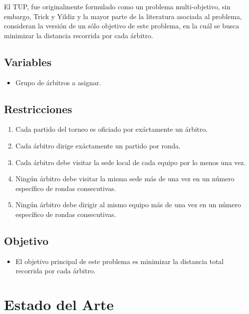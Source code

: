 \documentclass[letter, 10pt]{article}
\begin{document}
El TUP, fue originalmente formulado como un problema multi-objetivo, sin embargo, Trick y Yildiz \cite{trick_2007} y la mayor parte de la literatura asociada al problema, consideran la versi\'on de un s\'olo objetivo de este problema, en la cu\'al se busca minimizar la distancia recorrida por cada \'arbitro.

\subsection{Variables}
\begin{itemize}
  \item Grupo de \'arbitros a asignar.
\end{itemize}

\subsection{Restricciones}
\begin{enumerate}
  \item Cada partido del torneo es oficiado por ex\'actamente un \'arbitro.
  \item Cada \'arbitro dirige ex\'actamente un partido por ronda.
  \item Cada \'arbitro debe visitar la sede local de cada equipo por lo menos una vez.
  \item Ning\'un \'arbitro debe visitar la misma sede m\'as de una vez en un n\'umero espec\'ifico de rondas consecutivas.
  \item Ning\'un \'arbitro debe dirigir al mismo equipo m\'as de una vez en un n\'umero espec\'ifico de rondas consecutivas.
\end{enumerate}

\subsection{Objetivo}

\begin{itemize}
  \item El objetivo principal de este problema es minimizar la distancia total recorrida por cada \'arbitro.
\end{itemize}


\section{Estado del Arte}

\end{document}
